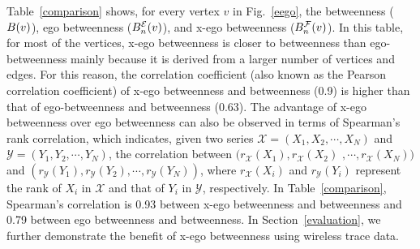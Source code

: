 Table~\ref{comparison} shows, for every vertex $v$ in Fig.~\ref{eego}, the betweenness ($B({v})$), ego betweenness ($B_{{n}}^{\mathcal{E}}({v})$), and x-ego betweenness ($B_{{n}}^{\mathcal{F}}({v})$).
In this table, for most of the vertices, x-ego betweenness is closer to betweenness than ego-betweenness mainly because it is derived from a larger number of vertices and edges.
For this reason, the correlation coefficient (also known as the Pearson correlation coefficient) of x-ego betweenness and betweenness (0.9) is higher than that of ego-betweenness and betweenness (0.63).
The advantage of x-ego betweenness over ego betweenness can also be observed in terms of Spearman's rank correlation, which indicates, given two series $\mathcal{X}=(X_1, X_2, \cdots, X_N)$ and $\mathcal{Y}=(Y_1, Y_2, \cdots, Y_N)$, the correlation between $(r_{\mathcal{X}}(X_1), r_{\mathcal{X}}(X_2)$ $, \cdots, r_{\mathcal{X}}(X_N))$ and $(r_{\mathcal{Y}}(Y_1), r_{\mathcal{Y}}(Y_2), \cdots, r_{\mathcal{Y}}(Y_N))$, where $r_{\mathcal{X}}(X_i)$ and $r_{\mathcal{Y}}(Y_i)$ represent the rank of $X_i$ in $\mathcal{X}$ and that of $Y_i$ in $\mathcal{Y}$, respectively.
In Table~\ref{comparison}, Spearman's correlation is 0.93 between x-ego betweenness and betweenness and 0.79 between ego betweenness and betweenness.
In Section~\ref{evaluation}, we further demonstrate the benefit of x-ego betweenness using wireless trace data.

